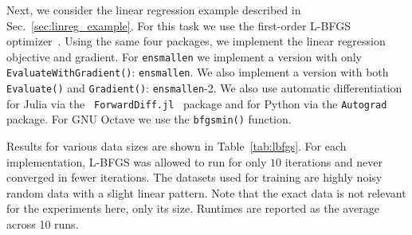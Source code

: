 \documentclass{article}
\begin{document}
Next, we consider the linear regression example described in
Sec.~\ref{sec:linreg_example}.  For this task we use the first-order L-BFGS
optimizer~\cite{zhu1997algorithm}.  Using the same four packages, we implement
the linear regression objective and gradient.  For \texttt{\small ensmallen} we
implement a version with only \texttt{\small EvaluateWithGradient()}:
\texttt{\small ensmallen}.  We also implement a version with both \texttt{\small
Evaluate()} and \texttt{\small Gradient()}: \texttt{\small ensmallen}-2.  We
also use automatic differentiation for Julia via the \texttt{\small
ForwardDiff.jl}~\cite{RevelsLubinPapamarkou2016} package and for Python via the
\texttt{\small Autograd}~\cite{maclaurin2015autograd}
package.  For GNU Octave we use the \texttt{\small bfgsmin()} function.



Results for various data sizes are shown in Table~\ref{tab:lbfgs}.  For each
implementation, L-BFGS was allowed to run for only $10$ iterations and never
converged in fewer iterations.  The datasets used for training are highly noisy random
data with a slight linear pattern. Note that the exact data is not relevant
for the experiments here, only its size.  Runtimes are reported as the
average across 10 runs.
\end{document}
